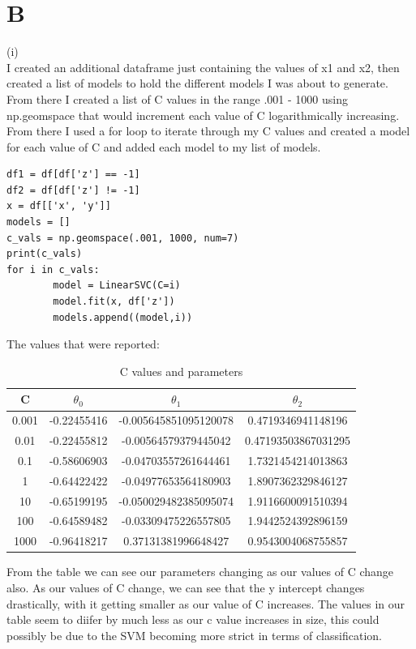 \documentclass[10pt,a4paper]{article}
\begin{document}
\section{B}
(i)
\\ I created an additional dataframe just containing the values of x1 and x2, then created a list of models to hold the different models I was about to generate. From there I created a list of C values in the range .001 - 1000 using np.geomspace that would increment each value of C logarithmically increasing. From there I used a for loop to iterate through my C values and created a model for each value of C and added each model to my list of models. 
\begin{verbatim}
df1 = df[df['z'] == -1]
df2 = df[df['z'] != -1]
x = df[['x', 'y']]
models = []
c_vals = np.geomspace(.001, 1000, num=7)
print(c_vals)
for i in c_vals:
        model = LinearSVC(C=i)
        model.fit(x, df['z'])
        models.append((model,i))
\end{verbatim}
The values that were reported:
\begin{table}[h]
\begin{center}
\begin{tabular}{| c | c | c | c |}
\hline
C & \(\theta_0\) & \(\theta_1\) & \(\theta_2\) \\
\hline
0.001 & -0.22455416  & -0.005645851095120078 & 0.4719346941148196 \\
\hline
0.01 & -0.22455812 & -0.00564579379445042 & 0.47193503867031295 \\
\hline
0.1 & -0.58606903 & -0.04703557261644461 & 1.7321454214013863 \\
\hline
1 & -0.64422422 & -0.04977653564180903 & 1.8907362329846127 \\
\hline
10 & -0.65199195 & -0.050029482385095074 & 1.9116600091510394 \\
\hline
100 & -0.64589482 & -0.03309475226557805 & 1.9442524392896159 \\
\hline
1000 & -0.96418217 & 0.37131381996648427 & 0.9543004068755857 \\
\hline
\end{tabular}
\caption{C values and parameters}
\end{center}
\end{table}
From the table we can see our parameters changing as our values of C change also. As our values of C change, we can see that the y intercept changes drastically, with it getting smaller as our value of C increases. The values in our table seem to diifer by much less as our c value increases in size, this could possibly be due to the SVM becoming more strict in terms of classification. 
\end{document}
